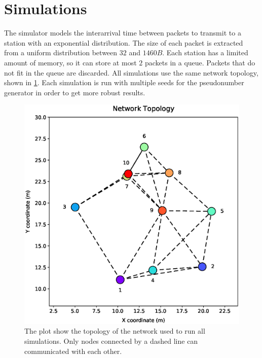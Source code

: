 \section{Simulations}
\label{sec:simulation}

The simulator models the interarrival time between packets to transmit to a station with an exponential distribution.
The size of each packet is extracted from a uniform distribution between $32$ and $1460 B$.
Each station has a limited amount of memory, so it can store at most $2$ packets in a queue.
Packets that do not fit in the queue are discarded.
All simulations use the same network topology, shown in \cref{fig:network}.
Each simulation is run with multiple seeds for the pseudonumber generator in order to get more robust results.

\begin{figure}[ht]
	\centering
	\includegraphics[width=0.9\columnwidth]{figures/plots/topology}
	\caption{The plot show the topology of the network used to run all simulations. Only nodes connected by a dashed line can communicated with each other.}
	\label{fig:network}
\end{figure}
